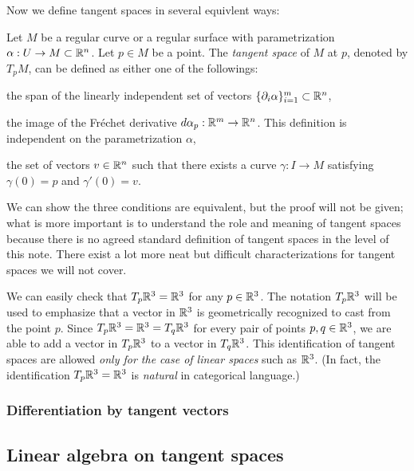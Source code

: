 \documentclass{../exp}
\def\a{\alpha}
\begin{document}
Now we define tangent spaces in several equivlent ways:
\begin{defn}
Let $M$ be a regular curve or a regular surface with parametrization $\a:U\to M\subset\R^n$.
Let $p\in M$ be a point.
The \emph{tangent space} of $M$ at $p$, denoted by $T_pM$, can be defined as either one of the followings:
\begin{cond}
\item the span of the linearly independent set of vectors $\{\pd_i\a\}_{i=1}^m\subset\R^n$,
\item the image of the Fr\'echet derivative $d\a_p:\R^m\to\R^n$.
This definition is independent on the parametrization $\a$,
\item the set of vectors $v\in\mathbb{R}^n$ such that there exists a curve $\gamma:I\to M$ satisfying $\gamma(0)=p$ and $\gamma'(0)=v$.
\end{cond}
\end{defn}
\begin{rmk}
We can show the three conditions are equivalent, but the proof will not be given; what is more important is to understand the role and meaning of tangent spaces because there is no agreed standard definition of tangent spaces in the level of this note.
There exist a lot more neat but difficult characterizations for tangent spaces we will not cover.
\end{rmk}
\begin{rmk}
We can easily check that $T_p\mathbb{R}^3=\mathbb{R}^3$ for any $p\in\mathbb{R}^3$.
The notation $T_p\mathbb{R}^3$ will be used to emphasize that a vector in $\mathbb{R}^3$ is geometrically recognized to cast from the point $p$.
Since $T_p\mathbb{R}^3=\mathbb{R}^3=T_q\mathbb{R}^3$ for every pair of points $p,q\in\mathbb{R}^3$, we are able to add a vector in $T_p\mathbb{R}^3$ to a vector in $T_q\mathbb{R}^3$.
This identification of tangent spaces are allowed \emph{only for the case of linear spaces} such as $\mathbb{R}^3$.
(In fact, the identification $T_p\mathbb{R}^3=\mathbb{R}^3$ is \emph{natural} in categorical language.)
\end{rmk}


\subsubsection{Differentiation by tangent vectors}





\subsection{Linear algebra on tangent spaces}
\end{document}
